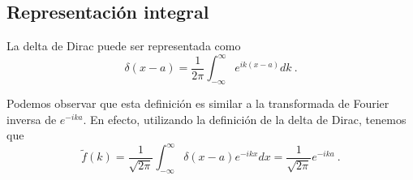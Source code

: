 \subsection{Representación integral}

La delta de Dirac puede ser representada como
\begin{equation} \label{eq:Dirac-Integral}
    \delta(x-a) = \frac{1}{2\pi} \int_{-\infty}^{\infty} e^{ik(x-a)} dk \ .
\end{equation}

Podemos observar que esta definición es similar a la transformada de Fourier inversa de $e^{-ika}$. En efecto, utilizando la definición de la delta de Dirac, tenemos que
\begin{equation}
    \tilde{f}(k) = \frac{1}{\sqrt{2\pi}} \int_{-\infty}^\infty \delta(x-a) e^{-ikx} dx = \frac{1}{\sqrt{2\pi}} e^{-ika} \ .
\end{equation}

